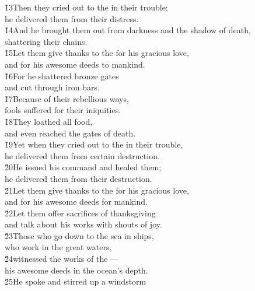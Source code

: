 \begin{poetry}
\poeml \v{13}Then they cried out to the  in their trouble; \\
\poemll    he delivered them from their distress. \\
\poeml \v{14}And he brought them out from darkness and the shadow of death, \\
\poemll    shattering their chains. \\
\poeml \v{15}Let them give thanks to the  for his gracious love, \\
\poemll    and for his awesome deeds to mankind. \\
\poeml \v{16}For he shattered bronze gates \\
\poemll    and cut through iron bars. \\
\poeml \v{17}Because of their rebellious ways, \\
\poemll    fools suffered for their iniquities. \\
\poeml \v{18}They loathed all food, \\
\poemll    and even reached the gates of death. \\
\poeml \v{19}Yet when they cried out to the  in their trouble, \\
\poemll    he delivered them from certain destruction. \\
\poeml \v{20}He issued his command and healed them; \\
\poemll    he delivered them from their destruction. \\
\poeml \v{21}Let them give thanks to the  for his gracious love, \\
\poemll    and for his awesome deeds for mankind. \\
\poeml \v{22}Let them offer sacrifices of thanksgiving \\
\poemll    and talk about his works with shouts of joy. \\
\poeml \v{23}Those who go down to the sea in ships, \\
\poemll    who work in the great waters, \\
\poeml \v{24}witnessed the works of the --- \\
\poemll    his awesome deeds in the ocean's depth. \\
\poeml \v{25}He spoke and stirred up a windstorm \\

\end{poetry}

